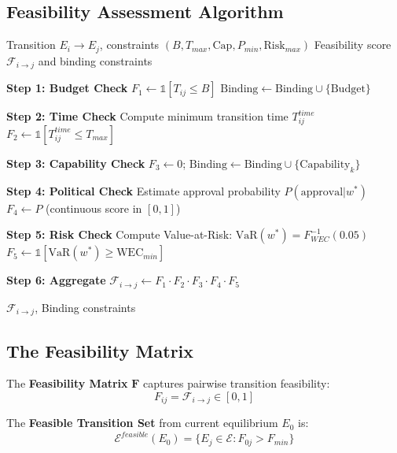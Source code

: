 \subsection{Feasibility Assessment Algorithm}

\begin{algorithm}[H]
\caption{Feasibility Assessment (FEAS)}
\label{alg:feasibility}
\begin{algorithmic}[1]
\Require Transition $E_i \to E_j$, constraints $(B, T_{max}, \text{Cap}, P_{min}, \text{Risk}_{max})$
\Ensure Feasibility score $\mathcal{F}_{i \to j}$ and binding constraints

\State \textbf{Step 1: Budget Check}
\State $F_1 \gets \mathbb{1}[T_{ij} \leq B]$
    \State $\text{Binding} \gets \text{Binding} \cup \{\text{Budget}\}$
\EndIf

\State \textbf{Step 2: Time Check}
\State Compute minimum transition time $T_{ij}^{time}$
\State $F_2 \gets \mathbb{1}[T_{ij}^{time} \leq T_{max}]$

\State \textbf{Step 3: Capability Check}
        \State $F_3 \gets 0$; $\text{Binding} \gets \text{Binding} \cup \{\text{Capability}_k\}$
    \EndIf
\EndFor

\State \textbf{Step 4: Political Check}
\State Estimate approval probability $P(\text{approval} | w^*)$
\State $F_4 \gets P$ (continuous score in $[0,1]$)

\State \textbf{Step 5: Risk Check}
\State Compute Value-at-Risk: $\text{VaR}(w^*) = F^{-1}_{WEC}(0.05)$
\State $F_5 \gets \mathbb{1}[\text{VaR}(w^*) \geq \text{WEC}_{min}]$

\State \textbf{Step 6: Aggregate}
\State $\mathcal{F}_{i \to j} \gets F_1 \cdot F_2 \cdot F_3 \cdot F_4 \cdot F_5$

\Return $\mathcal{F}_{i \to j}$, Binding constraints
\end{algorithmic}
\end{algorithm}

\subsection{The Feasibility Matrix}

\begin{definition}
The \textbf{Feasibility Matrix} $\mathbf{F}$ captures pairwise transition feasibility:
\begin{equation}
F_{ij} = \mathcal{F}_{i \to j} \in [0, 1]
\end{equation}

The \textbf{Feasible Transition Set} from current equilibrium $E_0$ is:
\begin{equation}
\mathcal{E}^{feasible}(E_0) = \{E_j \in \mathcal{E} : F_{0j} > F_{min}\}
\end{equation}
\end{definition}

